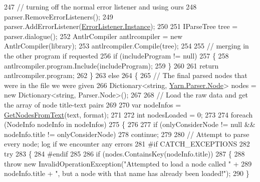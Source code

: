 \begin{DoxyCode}
247                 \textcolor{comment}{// turning off the normal error listener and using ours}
248                 parser.RemoveErrorListeners();
249                 parser.AddErrorListener(\hyperlink{a00090_a47b8f4f1d414afa1ea6067218c7ee34d}{ErrorListener.Instance});
250 
251                 IParseTree tree = parser.dialogue();
252                 AntlrCompiler antlrcompiler = \textcolor{keyword}{new} AntlrCompiler(library);
253                 antlrcompiler.Compile(tree);
254 
255                 \textcolor{comment}{// merging in the other program if requested}
256                 \textcolor{keywordflow}{if} (includeProgram != null)
257                 \{
258                     antlrcompiler.program.Include(includeProgram);
259                 \}
260 
261                 \textcolor{keywordflow}{return} antlrcompiler.program;
262             \}
263             \textcolor{keywordflow}{else}
264             \{
265                 \textcolor{comment}{// The final parsed nodes that were in the file we were given}
266                 Dictionary<string, \hyperlink{a00128}{Yarn.Parser.Node}> nodes = \textcolor{keyword}{new} Dictionary<string, 
      Parser.Node>();
267 
268                 \textcolor{comment}{// Load the raw data and get the array of node title-text pairs}
269 
270                 var nodeInfos = \hyperlink{a00123_a0aa76ba9366b44bf78198a78ea958c9c}{GetNodesFromText}(text, format);
271 
272                 \textcolor{keywordtype}{int} nodesLoaded = 0;
273 
274                 \textcolor{keywordflow}{foreach} (NodeInfo nodeInfo \textcolor{keywordflow}{in} nodeInfos)
275                 \{
276 
277                     \textcolor{keywordflow}{if} (onlyConsiderNode != null && nodeInfo.title != onlyConsiderNode)
278                         \textcolor{keywordflow}{continue};
279 
280                     \textcolor{comment}{// Attempt to parse every node; log if we encounter any errors}
281 \textcolor{preprocessor}{#if CATCH\_EXCEPTIONS}
282 \textcolor{preprocessor}{}                    \textcolor{keywordflow}{try}
283                     \{
284 \textcolor{preprocessor}{#endif}
285 \textcolor{preprocessor}{}
286                         \textcolor{keywordflow}{if} (nodes.ContainsKey(nodeInfo.title))
287                         \{
288                             \textcolor{keywordflow}{throw} \textcolor{keyword}{new} InvalidOperationException(\textcolor{stringliteral}{"Attempted to load a node called "} +
289                                 nodeInfo.title + \textcolor{stringliteral}{", but a node with that name has already been loaded!"});
290                         \}

\end{DoxyCode}
